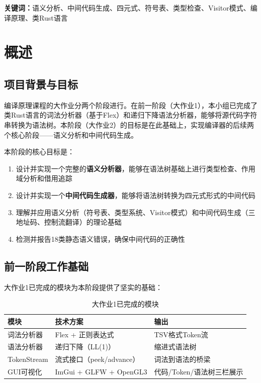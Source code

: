 \documentclass[12pt,a4paper]{ctexart}
\begin{document}
\textbf{关键词：}语义分析、中间代码生成、四元式、符号表、类型检查、Visitor模式、编译原理、类Rust语言

\newpage

\section{概述}

\subsection{项目背景与目标}

编译原理课程的大作业分两个阶段进行。在前一阶段（大作业1），本小组已完成了类Rust语言的词法分析器（基于Flex）和递归下降语法分析器，能够将源代码字符串转换为语法树。本阶段（大作业2）的目标是在此基础上，实现编译器的后续两个核心阶段——语义分析和中间代码生成。

本阶段的核心目标是：
\begin{enumerate}
    \item 设计并实现一个完整的\textbf{语义分析器}，能够在语法树基础上进行类型检查、作用域分析和借用追踪
    \item 设计并实现一个\textbf{中间代码生成器}，能够将语法树转换为四元式形式的中间代码
    \item 理解并应用语义分析（符号表、类型系统、Visitor模式）和中间代码生成（三地址码、控制流翻译）的理论基础
    \item 检测并报告18类静态语义错误，确保中间代码的正确性
\end{enumerate}

\subsection{前一阶段工作基础}

大作业1已完成的模块为本阶段提供了坚实的基础：

\begin{table}[H]
\centering
\caption{大作业1已完成的模块}
\begin{tabular}{|l|l|l|}
\hline
\textbf{模块} & \textbf{技术方案} & \textbf{输出} \\
\hline
词法分析器 & Flex + 正则表达式 & TSV格式Token流 \\
\hline
语法分析器 & 递归下降（LL(1)） & 缩进式语法树 \\
\hline
TokenStream & 流式接口（peek/advance） & 词法到语法的桥梁 \\
\hline
GUI可视化 & ImGui + GLFW + OpenGL3 & 代码/Token/语法树三栏展示 \\
\hline
\end{tabular}
\end{table}
\end{document}
